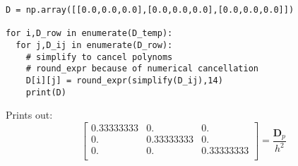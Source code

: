 \documentclass[m,times]{cgMA}
\newenvironment{code}{\captionsetup{type=algorithm}}{}
\begin{document}
\begin{appendices}
\begin{code}
\begin{verbatim}
D = np.array([[0.0,0.0,0.0],[0.0,0.0,0.0],[0.0,0.0,0.0]])

for i,D_row in enumerate(D_temp):
  for j,D_ij in enumerate(D_row):
    # simplify to cancel polynoms
    # round_expr because of numerical cancellation
    D[i][j] = round_expr(simplify(D_ij),14)
    print(D)
\end{verbatim}
\end{code}
  Prints out:
  $$
  \left[
    \begin{array}{ccc}
      0.33333333 &0.         &0.        \\
      0.         &0.33333333 &0.	\\
      0.         &0.         &0.33333333\\
  \end{array}\right]= \frac{\boldsymbol{D}_p}{h^2}
  $$
\end{appendices}
\clearpage
\listoffigures
\listoftables
\lstlistoflistings
\clearpage
{}
\printbibliography
\end{document}
